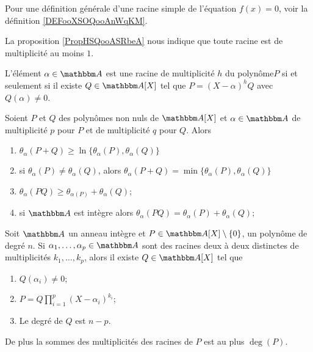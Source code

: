Pour une définition générale d'une racine simple de l'équation \( f(x)=0\), voir la définition \ref{DEFooXSOQooAnWqKM}.

La proposition \ref{PropHSQooASRbeA} nous indique que toute racine est de multiplicité au moins \( 1\).

\begin{proposition}     \label{PropahQQpA}
    L'élément \( \alpha\in \eA\) est une racine de multiplicité \( h\) du polynôme\( P\) si et seulement si il existe \( Q\in\eA[X]\) tel que \( P=(X-\alpha)^hQ\) avec \( Q(\alpha)\neq 0\).
\end{proposition}

\begin{lemma}       \label{LemIeLhpc}
    Soient \( P\) et \( Q\) des polynômes non nuls de \( \eA[X]\) et \( \alpha\in \eA\) de multiplicité \( p\) pour \( P\) et de multiplicité \( q\) pour \( Q\). Alors
    \begin{enumerate}
        \item
            \( \theta_{\alpha}(P+Q)\geq\ln\{ \theta_{\alpha}(P),\theta_{\alpha}(Q) \}\)
        \item
            si \( \theta_{\alpha}(P)\neq \theta_{\alpha}(Q)\), alors \( \theta_{\alpha}(P+Q)=\min\{ \theta_{\alpha}(P),\theta_{\alpha}(Q) \}\)
        \item
            \( \theta_{\alpha}(PQ)\geq \theta_{\alpha(P)}+\theta_{\alpha}(Q)\);
        \item       \label{ItemIeLhpciv}
            si \(\eA \) est intègre alors \( \theta_{\alpha}(PQ)= \theta_{\alpha}(P)+\theta_{\alpha}(Q)\);
    \end{enumerate}
\end{lemma}

\begin{theorem} \label{ThoSVZooMpNANi}
    Soit \( \eA\) un anneau intègre et \( P\in \eA[X]\setminus\{ 0 \}\), un polynôme de degré \( n\). Si \( \alpha_1,\ldots, \alpha_p\in\eA\) sont des racines deux à deux distinctes de multiplicités \( k_1,\ldots, k_p\), alors il existe \( Q\in \eA[X]\) tel que
    \begin{enumerate}
        \item
            \( Q(\alpha_i)\neq 0\);
        \item   \label{ItemJZZVooMogYLq}
            \( P=Q\prod_{i=1}^p(X-\alpha_i)^{k_i}\);
        \item
            Le degré de \( Q\) est \( n-p\).
    \end{enumerate}
    De plus la sommes des multiplicités des racines de \( P\) est au plus \( \deg(P)\).
\end{theorem}

